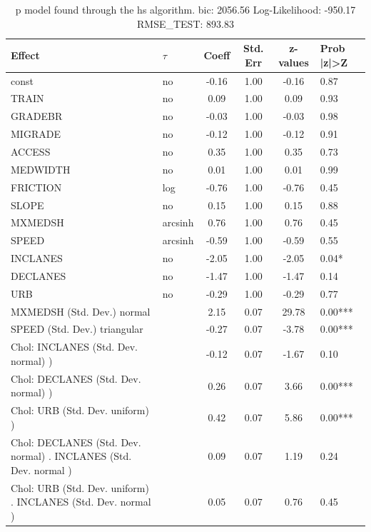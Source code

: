 \begin{table}
	\caption{p model found through the hs algorithm. bic: 2056.56 Log-Likelihood: -950.17 RMSE_TEST: 893.83}
	\begin{center}
		\begin{tabular}{|l|l|c|c|c|l|}
			\hline
			Effect & $\tau$ & Coeff & Std. Err & z-values & Prob |z|>Z \\
			\hline
			const & no & -0.16 & 1.00 & -0.16 & 0.87 \\
			\hline
			TRAIN & no & 0.09 & 1.00 & 0.09 & 0.93 \\
			\hline
			GRADEBR & no & -0.03 & 1.00 & -0.03 & 0.98 \\
			\hline
			MIGRADE & no & -0.12 & 1.00 & -0.12 & 0.91 \\
			\hline
			ACCESS & no & 0.35 & 1.00 & 0.35 & 0.73 \\
			\hline
			MEDWIDTH & no & 0.01 & 1.00 & 0.01 & 0.99 \\
			\hline
			FRICTION & log & -0.76 & 1.00 & -0.76 & 0.45 \\
			\hline
			SLOPE & no & 0.15 & 1.00 & 0.15 & 0.88 \\
			\hline
			MXMEDSH & arcsinh & 0.76 & 1.00 & 0.76 & 0.45 \\
			\hline
			SPEED & arcsinh & -0.59 & 1.00 & -0.59 & 0.55 \\
			\hline
			INCLANES & no & -2.05 & 1.00 & -2.05 & 0.04* \\
			\hline
			DECLANES & no & -1.47 & 1.00 & -1.47 & 0.14 \\
			\hline
			URB & no & -0.29 & 1.00 & -0.29 & 0.77 \\
			\hline
			MXMEDSH (Std. Dev.) normal &  & 2.15 & 0.07 & 29.78 & 0.00*** \\
			\hline
			SPEED (Std. Dev.) triangular &  & -0.27 & 0.07 & -3.78 & 0.00*** \\
			\hline
			 Chol: INCLANES (Std. Dev. normal) ) &  & -0.12 & 0.07 & -1.67 & 0.10 \\
			\hline
			 Chol: DECLANES (Std. Dev. normal) ) &  & 0.26 & 0.07 & 3.66 & 0.00*** \\
			\hline
			 Chol: URB (Std. Dev. uniform) ) &  & 0.42 & 0.07 & 5.86 & 0.00*** \\
			\hline
			 Chol: DECLANES (Std. Dev. normal) . INCLANES (Std. Dev.   normal ) &  & 0.09 & 0.07 & 1.19 & 0.24 \\
			\hline
			 Chol: URB (Std. Dev. uniform) . INCLANES (Std. Dev.   normal ) &  & 0.05 & 0.07 & 0.76 & 0.45 \\

\end{tabular}
\end{center}
\end{table}
